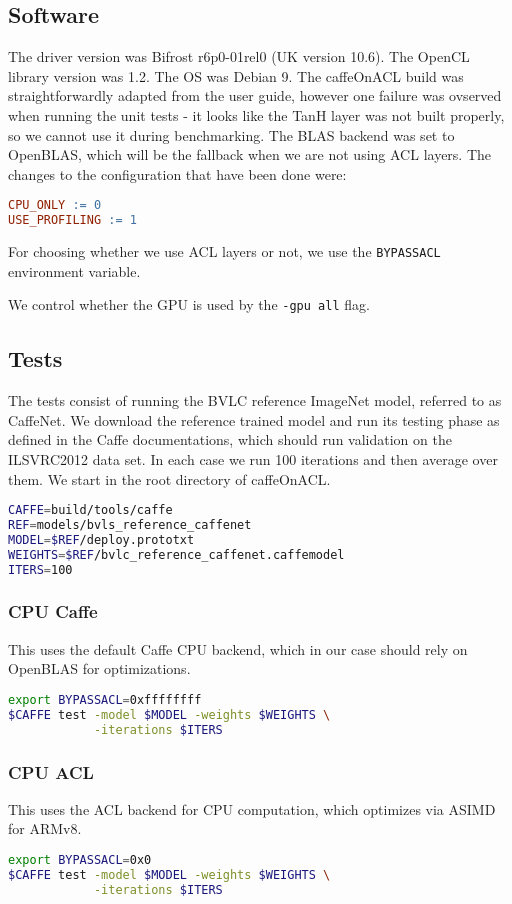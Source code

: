 \documentclass[12pt, a4paper, notitlepage]{report}
\begin{document}
\subsection*{Software}
The driver version was Bifrost r6p0-01rel0 (UK version 10.6).
The OpenCL library version was 1.2.
The OS was Debian 9.
The caffeOnACL build was straightforwardly adapted from the user guide, however one failure was ovserved when running the unit tests - it looks like the TanH layer was not built properly, so we cannot use it during benchmarking. The BLAS backend was set to OpenBLAS, which will be the fallback when we are not using ACL layers. The changes to the configuration that have been done were:\cite{coacl}
\begin{lstlisting}[language=make]
CPU_ONLY := 0
USE_PROFILING := 1
\end{lstlisting}

For choosing whether we use ACL layers or not, we use the \verb|BYPASSACL| environment variable.

We control whether the GPU is used by the \verb|-gpu all| flag.

\subsection*{Tests}
The tests consist of running the BVLC reference ImageNet model, referred to as CaffeNet. We download the reference trained model and run its testing phase as defined in the Caffe documentations, which should run validation on the ILSVRC2012 data set. In each case we run 100 iterations and then average over them.\cite{caffe}
We start in the root directory of caffeOnACL.
\begin{lstlisting}[language=bash]
CAFFE=build/tools/caffe
REF=models/bvls_reference_caffenet
MODEL=$REF/deploy.prototxt
WEIGHTS=$REF/bvlc_reference_caffenet.caffemodel
ITERS=100
\end{lstlisting}
\subsubsection*{CPU Caffe}
This uses the default Caffe CPU backend, which in our case should rely on OpenBLAS for optimizations.
\begin{lstlisting}[language=bash]
export BYPASSACL=0xffffffff
$CAFFE test -model $MODEL -weights $WEIGHTS \
            -iterations $ITERS
\end{lstlisting}

\subsubsection*{CPU ACL}
This uses the ACL backend for CPU computation, which optimizes via ASIMD for ARMv8.\cite{acl}
\begin{lstlisting}[language=bash]
export BYPASSACL=0x0
$CAFFE test -model $MODEL -weights $WEIGHTS \
            -iterations $ITERS
\end{lstlisting}
\end{document}
